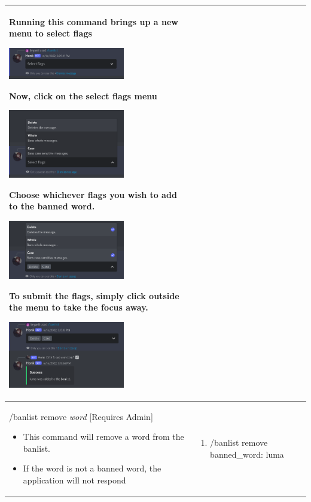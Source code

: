 \documentclass{scrartcl}
\begin{document}
\begin{tabularx}{\textwidth}{|>{\raggedright\arraybackslash}X|>{\raggedright\arraybackslash}X|}
\begin{enumerate}
\end{enumerate}
    Running this command brings up a new menu to select flags
\begin{center}
        \includegraphics[width=2in]{images/banlist/select.png}
\end{center}
Now, click on the select flags menu
\begin{center}
    \includegraphics[width=2in]{images/banlist/flags.png}
\end{center}
Choose whichever flags you wish to add to the banned word.
\begin{center}
    \includegraphics[width=2in]{images/banlist/selected.png}
\end{center}
To submit the flags, simply click outside the menu to take the focus away.
\begin{center}
    \includegraphics[width=2in]{images/banlist/added.png}
\end{center}
\\
\hline
/banlist remove \textit{word} [Requires Admin]
\begin{itemize}
    \item This command will remove a word from the banlist. 
    \item If the word is not a banned word, the application will not respond
\end{itemize}&
\begin{enumerate}
    \item /banlist remove banned\_word: \color{gray} luma \color{black}
    

\end{enumerate}
\end{tabularx}
\end{document}
